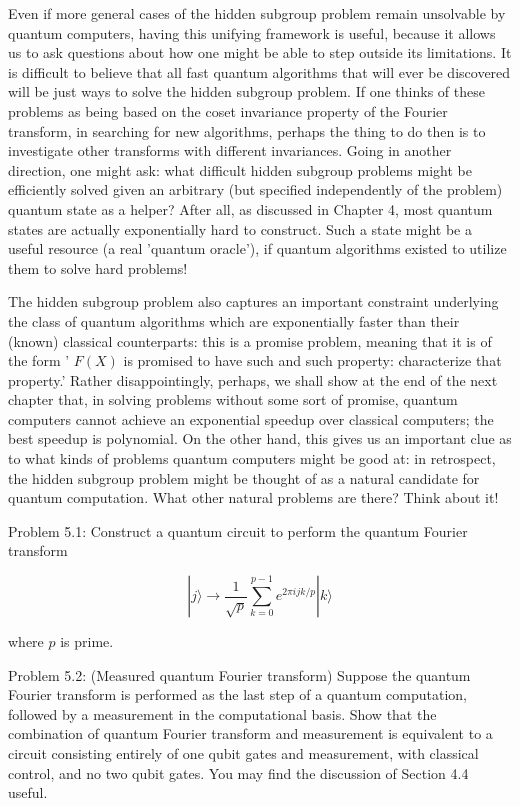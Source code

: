 Even if more general cases of the hidden subgroup problem remain unsolvable by quantum computers, having this unifying framework is useful, because it allows us to ask questions about how one might be able to step outside its limitations. It is difficult to believe that all fast quantum algorithms that will ever be discovered will be just ways to solve the hidden subgroup problem. If one thinks of these problems as being based on the coset invariance property of the Fourier transform, in searching for new algorithms, perhaps the thing to do then is to investigate other transforms with different invariances. Going in another direction, one might ask: what difficult hidden subgroup problems might be efficiently solved given an arbitrary (but specified independently of the problem) quantum state as a helper? After all, as discussed in Chapter 4, most quantum states are actually exponentially hard to construct. Such a state might be a useful resource (a real 'quantum oracle'), if quantum algorithms existed to utilize them to solve hard problems!

The hidden subgroup problem also captures an important constraint underlying the class of quantum algorithms which are exponentially faster than their (known) classical counterparts: this is a promise problem, meaning that it is of the form ' $F(X)$ is promised to have such and such property: characterize that property.' Rather disappointingly, perhaps, we shall show at the end of the next chapter that, in solving problems without some sort of promise, quantum computers cannot achieve an exponential speedup over classical computers; the best speedup is polynomial. On the other hand, this gives us an important clue as to what kinds of problems quantum computers might be good at: in retrospect, the hidden subgroup problem might be thought of as a natural candidate for quantum computation. What other natural problems are there? Think about it!

Problem 5.1: Construct a quantum circuit to perform the quantum Fourier transform

\begin{equation}
    |j\rangle \longrightarrow \frac{1}{\sqrt{p}} \sum_{k=0}^{p-1} e^{2 \pi i j k / p}|k\rangle \tag{5.79}
\end{equation}

where $p$ is prime.

Problem 5.2: (Measured quantum Fourier transform) Suppose the quantum Fourier transform is performed as the last step of a quantum computation, followed by a measurement in the computational basis. Show that the combination of quantum Fourier transform and measurement is equivalent to a circuit consisting entirely of one qubit gates and measurement, with classical control, and no two qubit gates. You may find the discussion of Section 4.4 useful.

